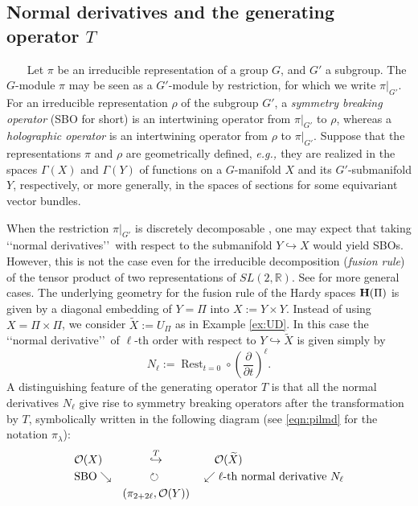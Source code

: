 \documentclass[12pt,leqno]{amsart}
\theoremstyle{plain}
\theoremstyle{definition}
\begin{document}
\subsection {Normal derivatives and the generating operator $T$}
~~~
\newline
Let $\pi$ be an irreducible representation of a group $G$, 
 and $G'$ a subgroup.  
The $G$-module $\pi$ may be seen 
 as a $G'$-module
 by restriction, 
 for which we write $\pi|_{G'}$.  
For an irreducible representation $\rho$ 
 of the subgroup $G'$, 
 a {\it{symmetry breaking operator}}
 (SBO for short)
 is an intertwining operator from $\pi|_{G'}$
 to $\rho$, 
 whereas a {\it{holographic operator}} is an intertwining operator from 
$\rho$ to $\pi|_{G'}$.  
Suppose that the representations $\pi$ and $\rho$
 are geometrically defined, 
 {\it{e.g., }}
 they are realized
 in the spaces $\Gamma(X)$ and $\Gamma(Y)$
 of functions on a $G$-manifold $X$
 and its $G'$-submanifold $Y$, 
 respectively, 
 or more generally, 
 in the spaces of sections for some equivariant vector bundles.  



When the restriction $\pi|_{G'}$
 is discretely decomposable
 \cite{xkdecomp}, 
 one may expect
 that taking \lq\lq{normal derivatives}\rq\rq\ 
 with respect to the submanifold $Y \hookrightarrow X$
 would yield SBOs.  
However, 
 this is not the case
even for the irreducible decomposition ({\it{fusion rule}})
 of the tensor product of two representations of $SL(2,{\mathbb{R}})$.  
See \cite[Thm.\ 5.3]{KP16} for more general cases.  
The underlying geometry for the fusion rule 
 of the Hardy spaces
 ${\bf{H}}(\Pi)$
 is given by a diagonal embedding
 of $Y=\Pi$ into $X:=Y \times Y$.  
Instead of using $X=\Pi \times \Pi$, 
 we consider $\widetilde X:=U_{\Pi}$
 as in Example \ref{ex:UD}.  
In this case 
 the \lq\lq{normal derivative}\rq\rq\
 of $\ell$-th order
 with respect to $Y \hookrightarrow \widetilde X$
 is given simply by 
\[
   N_{\ell}:=\operatorname{Rest}_{t=0} \circ (\frac{\partial}{\partial t})^{\ell}.  
\]
A distinguishing feature
 of the generating operator $T$
 is that all the normal derivatives
 $N_{\ell}$ give rise to symmetry breaking operators
 after the transformation by $T$, 
 symbolically written in the following diagram
 (see \eqref{eqn:pilmd} for the notation $\pi_{\lambda}$):
\begin{alignat*}{4}
&{\mathcal{O}}(X) 
&&\hphantom{MM}\overset{T}\hookrightarrow 
&&\hskip 1pc {\mathcal{O}}(\widetilde X)
\\
&\text{SBO}\searrow
&&\hphantom{MM}\circlearrowright
&&\swarrow \text{$\ell$-th normal derivative $N_{\ell}$}
\\
& &&(\pi_{2+2\ell},{\mathcal{O}}(Y)) &&
\end{alignat*}
\end{document}
